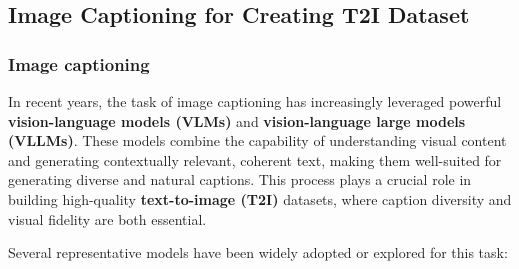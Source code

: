 \documentclass[conference]{IEEEtran}
\begin{document}
\subsection{Image Captioning for Creating T2I Dataset}
\subsubsection{Image captioning}
In recent years, the task of image captioning has increasingly leveraged powerful \textbf{vision-language models (VLMs)} and \textbf{vision-language large models (VLLMs)}. These models combine the capability of understanding visual content and generating contextually relevant, coherent text, making them well-suited for generating diverse and natural captions. This process plays a crucial role in building high-quality \textbf{text-to-image (T2I)} datasets, where caption diversity and visual fidelity are both essential.

Several representative models have been widely adopted or explored for this task:
\end{document}
